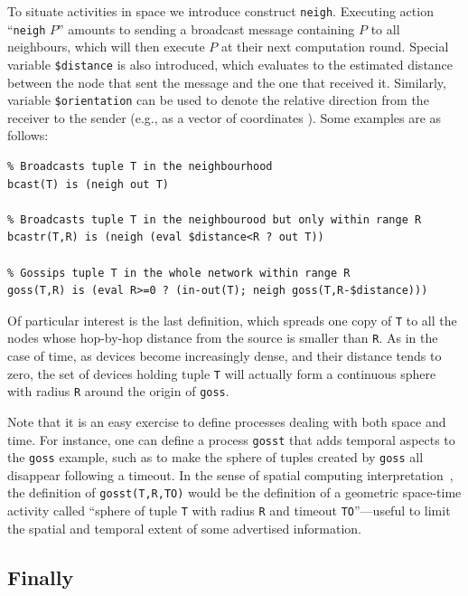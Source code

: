 \documentclass[12pt,a4paper,twoside,openright]{book}
\begin{document}
To situate activities in space we introduce construct \texttt{neigh}.
%
Executing action ``\texttt{neigh} $P$'' amounts to sending a broadcast message containing $P$ to all neighbours, which will then execute $P$ at their next computation round.
%
Special variable \texttt{\$distance} is also introduced, which evaluates to the estimated distance between the node that sent the message and the one that received it.
%
Similarly, variable \texttt{\$orientation} can be used to denote the relative direction from the receiver to the sender (e.g., as a vector of coordinates \cite{CardelliG10}).
%
Some examples are as follows:

{\begin{verbatim}
% Broadcasts tuple T in the neighbourhood
bcast(T) is (neigh out T)

% Broadcasts tuple T in the neighbourood but only within range R 
bcastr(T,R) is (neigh (eval $distance<R ? out T))

% Gossips tuple T in the whole network within range R
goss(T,R) is (eval R>=0 ? (in-out(T); neigh goss(T,R-$distance)))
\end{verbatim}}

\noindent Of particular interest is the last definition, which spreads one copy of \texttt{T} to all the nodes whose hop-by-hop distance from the source is smaller than \texttt{R}.
%
As in the case of time, as devices become increasingly dense, and their distance tends to zero, the set of devices holding tuple \texttt{T} will actually form a continuous sphere with radius \texttt{R} around the origin of \texttt{goss}.

Note that it is an easy exercise to define processes dealing with both space and time.
%
For instance, one can define a process \texttt{gosst} that adds temporal aspects to the \texttt{goss} example, such as to make the sphere of tuples created by \texttt{goss} all disappear following a timeout.
%
In the sense of spatial computing interpretation~\cite{proto}, the definition of \texttt{gosst(T,R,TO)} would be the definition of a geometric space-time activity called ``sphere of tuple \texttt{T} with radius \texttt{R} and timeout \texttt{TO}''---useful to limit the spatial and temporal extent of some advertised information.

\subsection{Finally}
\end{document}
